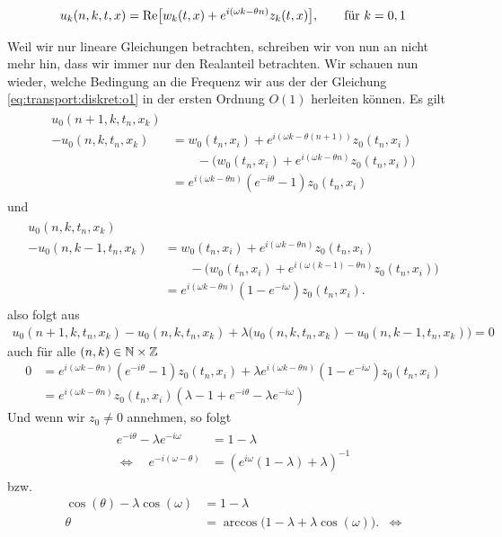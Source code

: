 \begin{align}
u_k(n, k, t, x) = \operatorname{Re} \bigl[ w_k(t, x) + e^{i (\omega k - \theta n)} z_k(t, x) \bigr], \qquad \text{für $k = 0,1$}
\end{align}

Weil wir nur lineare Gleichungen betrachten, schreiben wir von nun an nicht mehr hin, dass wir immer nur den Realanteil betrachten.
Wir schauen nun wieder, welche Bedingung an die Frequenz wir aus der der Gleichung \eqref{eq:transport:diskret:o1} in der ersten Ordnung $O(1)$ herleiten können.
Es gilt
\begin{align}\begin{split}
u_0(n+1,k,t_n,x_k)&\qquad\quad\\
- u_0(n,k,t_n,x_k) &= w_0(t_n,x_i) + e^{i (\omega k - \theta (n+1))} z_0(t_n,x_i)\\
    &\qquad - \bigl( w_0(t_n,x_i) + e^{i (\omega k - \theta n)} z_0(t_n,x_i) \bigr)\\
&= e^{i (\omega k - \theta n)} (e^{-i\theta} - 1) z_0(t_n,x_i)
\end{split}\end{align}
und
\begin{align}\begin{split}
u_0(n,k,t_n,x_k)\qquad \quad &\\
- u_0(n,k-1,t_n,x_k) &= w_0(t_n,x_i) + e^{i (\omega k - \theta n)} z_0(t_n,x_i)\\
& \qquad - \bigl( w_0(t_n,x_i) + e^{i (\omega (k-1) - \theta n)} z_0(t_n,x_i) \bigr)\\
&= e^{i (\omega k - \theta n)} (1 - e^{-i \omega}) z_0(t_n,x_i).
\end{split}\end{align}
also folgt aus
\begin{align*}
u_0(n+1,k,t_n,x_k) - u_0(n,k,t_n,x_k) + \lambda \bigl(u_0(n,k,t_n,x_k) - u_0(n,k-1,t_n,x_k) \bigr) = 0
\end{align*}
auch für alle $(n, k) \in \mathbb N \times \mathbb Z$
\begin{align}
0 &= e^{i (\omega k - \theta n)} (e^{-i\theta} - 1) z_0(t_n,x_i) + \lambda e^{i (\omega k - \theta n)} (1 - e^{-i \omega}) z_0(t_n,x_i)\\
&= e^{i (\omega k - \theta n)} z_0(t_n,x_i) ( \lambda - 1 + e^{-i\theta} - \lambda e^{-i \omega} )
\end{align}
Und wenn wir $z_0 \neq 0$ annehmen, so folgt
\begin{align}\label{eq:wkb:gl1}
\begin{split}
e^{-i \theta} - \lambda e^{-i \omega} &= 1 - \lambda\\
\Leftrightarrow \quad e^{-i (\omega - \theta)} &= \left( e^{i \omega} (1 -  \lambda) + \lambda \right)^{-1}
\end{split}
\end{align}
bzw.
\begin{align*}
\cos(\theta) - \lambda \cos(\omega) &= 1 - \lambda\\
\theta  &=  \arccos\bigl(1 - \lambda + \lambda \cos(\omega) \bigr). &\Leftrightarrow
\end{align*}


